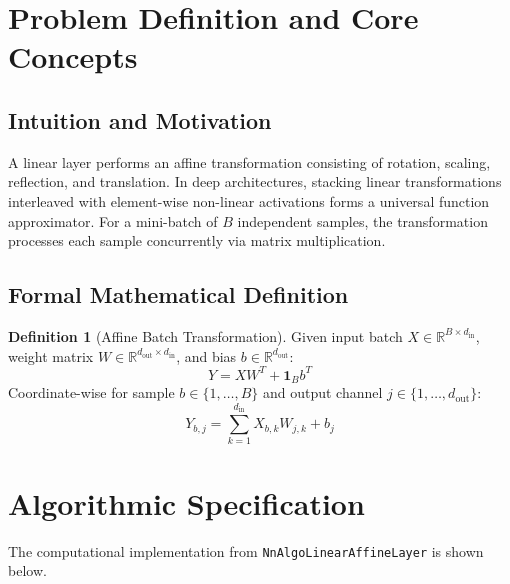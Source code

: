 \documentclass[11pt,a4paper]{article}
\theoremstyle{definition}
\newtheorem{definition}{Definition}[section]
\begin{document}
\section{Problem Definition and Core Concepts}

\subsection{Intuition and Motivation}
A linear layer performs an affine transformation consisting of rotation, scaling, reflection, and translation. In deep architectures, stacking linear transformations interleaved with element-wise non-linear activations forms a universal function approximator. For a mini-batch of $B$ independent samples, the transformation processes each sample concurrently via matrix multiplication.

\subsection{Formal Mathematical Definition}
\begin{definition}[Affine Batch Transformation]
Given input batch $X \in \mathbb{R}^{B \times d_{\text{in}}}$, weight matrix $W \in \mathbb{R}^{d_{\text{out}} \times d_{\text{in}}}$, and bias $b \in \mathbb{R}^{d_{\text{out}}}$:
\begin{equation}
Y = X W^T + \mathbf{1}_B b^T \label{eq:linear_batch}
\end{equation}
Coordinate-wise for sample $b \in \{1, \dots, B\}$ and output channel $j \in \{1, \dots, d_{\text{out}}\}$:
\begin{equation}
Y_{b, j} = \sum_{k=1}^{d_{\text{in}}} X_{b, k} W_{j, k} + b_j \label{eq:linear_elem}
\end{equation}
\end{definition}

\section{Algorithmic Specification}

The computational implementation from \texttt{NnAlgoLinearAffineLayer} is shown below.
\end{document}
